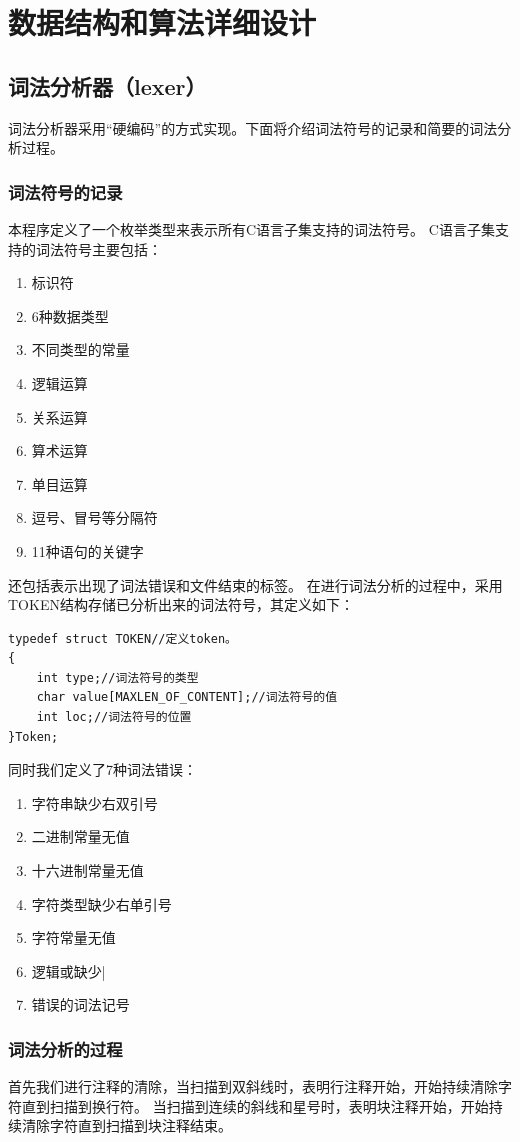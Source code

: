 \documentclass[supercite]{Experimental_Report}
\theoremstyle{definition}
\begin{document}
\newpage
\section{数据结构和算法详细设计}
\subsection{词法分析器（lexer）}
词法分析器采用“硬编码”的方式实现。下面将介绍词法符号的记录和简要的词法分析过程。
\subsubsection{词法符号的记录}
本程序定义了一个枚举类型来表示所有C语言子集支持的词法符号。
C语言子集支持的词法符号主要包括：
\begin{enumerate}
	\item 标识符
	\item 6种数据类型
	\item 不同类型的常量
	\item 逻辑运算
	\item 关系运算
	\item 算术运算
	\item 单目运算
	\item 逗号、冒号等分隔符
	\item 11种语句的关键字
\end{enumerate}
还包括表示出现了词法错误和文件结束的标签。
在进行词法分析的过程中，采用TOKEN结构存储已分析出来的词法符号，其定义如下：
\begin{lstlisting}[title =TOKEN的定义,frame=none]
typedef struct TOKEN//定义token。
{
	int type;//词法符号的类型
	char value[MAXLEN_OF_CONTENT];//词法符号的值
	int loc;//词法符号的位置
}Token;
\end{lstlisting}
同时我们定义了7种词法错误：
\begin{enumerate}
	\item 字符串缺少右双引号
	\item 二进制常量无值
	\item 十六进制常量无值
	\item 字符类型缺少右单引号
	\item 字符常量无值
	\item 逻辑或缺少|
	\item 错误的词法记号
\end{enumerate}
\subsubsection{词法分析的过程}
首先我们进行注释的清除，当扫描到双斜线时，表明行注释开始，开始持续清除字符直到扫描到换行符。
当扫描到连续的斜线和星号时，表明块注释开始，开始持续清除字符直到扫描到块注释结束。
\end{document}
